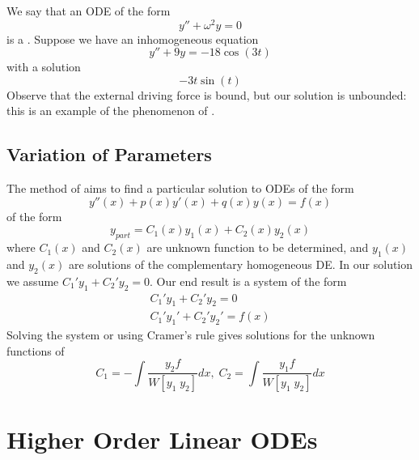 \documentclass[12pt, a4paper, oneside, openright, titlepage]{book}
\begin{document}

\begin{eg}[Resonance]
        We say that an ODE of the form \begin{equation}
                y'' + \omega^2y = 0
        \end{equation}
        is a . Suppose we have an inhomogeneous equation $$y''+9y=-18\cos(3t)$$ with a solution $$-3t\sin(t)$$ Observe that the external driving force is bound, but our solution is unbounded: this is an example of the phenomenon of .
\end{eg}



\section{Variation of Parameters}


\begin{defn}
        The method of  aims to find a particular solution to ODEs of the form \begin{equation}
                y''(x) + p(x)y'(x) + q(x)y(x) = f(x)
        \end{equation} 
        of the form \begin{equation}
                y_{part} = C_1(x)y_1(x) + C_2(x)y_2(x)
        \end{equation}
        where $C_1(x)$ and $C_2(x)$ are unknown function to be determined, and $y_1(x)$ and $y_2(x)$ are solutions of the complementary homogeneous DE. In our solution we assume $C_1'y_1 + C_2'y_2 = 0$. Our end result is a system of the form \begin{equation}
                \begin{matrix} C_1'y_1 + C_2'y_2 =0 \\ C_1'y_1' + C_2'y_2' = f(x) \end{matrix}
        \end{equation}
        Solving the system or using Cramer's rule gives solutions for the unknown functions of \begin{equation}
                C_1 = -\int\frac{y_2f}{W[y_1\;y_2]}dx,\;C_2 = \int\frac{y_1f}{W[y_1\;y_2]}dx
        \end{equation}
\end{defn}





\chapter{Higher Order Linear ODEs}
\end{document}
